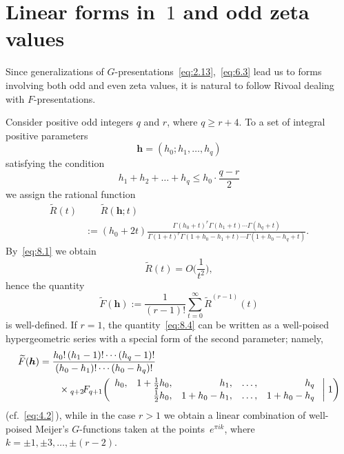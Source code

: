 \documentclass[a4paper,twoside]{article}
\numberwithin{equation}{section}
\renewcommand{\[}{\lfloor}
\renewcommand{\]}{\rfloor}
\newcommand{\<}{\langle}
\renewcommand{\>}{\rangle}
\newcommand{\wt}{\widetilde}
\newcommand{\bh}{\boldsymbol h}
\begin{document}
\section{Linear forms in~$1$ and odd zeta values}
\label{sec:8}
Since generalizations of $G$-presentations~\eqref{eq:2.13},~\eqref{eq:6.3}
lead us to forms involving both odd and even zeta values, it is
natural to follow Rivoal dealing with $F$-presentations.

Consider positive odd integers $q$ and $r$, where $q\ge r+4$.
To a set of integral positive parameters
$$
\bh=(h_0;h_1,\dots,h_q)
$$
satisfying the condition
\begin{equation}
h_1+h_2+\dots+h_q\le h_0\cdot\frac{q-r}2
\label{eq:8.1}
\end{equation}
we assign the rational function
\begin{align}
\wt R(t)
&\phantom:=\wt R(\bh;t)
\nonumber\\
&:=(h_0+2t)\frac{\Gamma(h_0+t)^r\Gamma(h_1+t)\dotsb\Gamma(h_q+t)}
{\Gamma(1+t)^r\Gamma(1+h_0-h_1+t)\dotsb\Gamma(1+h_0-h_q+t)}.
\label{eq:8.2}
\end{align}
By~\eqref{eq:8.1} we obtain
\begin{equation}
\wt R(t)=O\biggl(\frac1{t^2}\biggr),
\label{eq:8.3}
\end{equation}
hence the quantity
\begin{equation}
\wt F(\bh)
:=\frac1{(r-1)!}\sum_{t=0}^\infty\wt R^{(r-1)}(t)
\label{eq:8.4}
\end{equation}
is well-defined. If $r=1$, the quantity~\eqref{eq:8.4} can be written
as a well-poised hypergeometric series with a special form of the second
parameter; namely,
\begin{align*}
\wt F(\bh)
&=\frac{h_0!\,(h_1-1)!\dotsb(h_q-1)!}
{(h_0-h_1)!\dotsb(h_0-h_q)!}
\\ &\qquad\times %
{}_{q+2}\!F_{q+1}\biggl(\begin{array}{rrrrr}
h_0, & 1+\frac12h_0, &       h_1, & \dots, &       h_q \\[1pt]
     &   \frac12h_0, & 1+h_0-h_1, & \dots, & 1+h_0-h_q
\end{array}\biggm|1\biggr)
\end{align*}
(cf.~\eqref{eq:4.2}\,), while in the case $r>1$ we obtain
a linear combination of well-poised Meijer's $G$-functions
taken at the points~$e^{\pi ik}$,
where $k=\pm1,\pm3,\dots,\pm(r-2)$.
\end{document}
